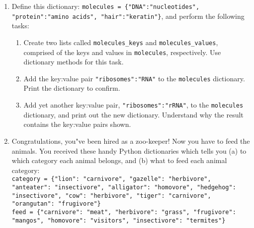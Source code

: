\documentclass{article}[12pt]
\newcommand{\code}[1]{\texttt{#1}}  %
\begin{document}
\begin{enumerate}
    \item Define this dictionary: \code{molecules = \{"DNA":"nucleotides", "protein":"amino acids", "hair":"keratin"\}}, and perform the following tasks:
    
    \begin{enumerate}
        \item Create two lists called \code{molecules\_keys} and \code{molecules\_values}, comprised of the keys and values in \code{molecules}, respectively. Use dictionary methods for this task.
        \item Add the key:value pair \code{"ribosomes":"RNA"} to the \code{molecules} dictionary. Print the dictionary to confirm.
        \item Add yet another key:value pair, \code{"ribosomes":"rRNA"}, to the \code{molecules} dictionary, and print out the new dictionary. Understand why the result contains the key:value pairs shown.
    \end{enumerate}
	
\item Congratulations, you"ve been hired as a zoo-keeper! Now you have to feed the animals. You received these handy Python dictionaries which tells you (a) to which category each animal belongs, and (b) what to feed each animal category: \\
	
	\code{category = \{"lion": "carnivore", "gazelle": "herbivore", "anteater": "insectivore", "alligator": "homovore", "hedgehog": "insectivore", "cow": "herbivore", "tiger": "carnivore", "orangutan": "frugivore"\}} \\
	
	\code{feed = \{"carnivore": "meat", "herbivore": "grass", "frugivore": "mangos", "homovore": "visitors", "insectivore": "termites"\} } \\
	

\end{enumerate}
\end{document}
